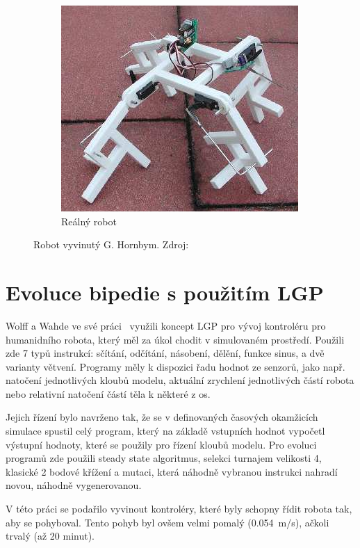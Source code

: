 \begin{figure}
\begin{subfigure}{.33\textwidth}
        \centering
        \includegraphics[width=.9\linewidth]{obrazky/hornby_model_1_real.png}
        \caption{Reálný robot}
        \label{fig:hornby_roboti_real}
    \end{subfigure}
    \caption{Robot vyvinutý G. Hornbym. Zdroj:~\cite{Hornby2003}}
    \label{fig:hornby_roboti}
\end{figure}

\section{Evoluce bipedie s použitím LGP}
\label{sec:bipedie_lgp}

Wolff a Wahde ve své práci~\cite{Wolff2007} využili koncept LGP pro vývoj kontroléru pro humanidního robota, který měl za úkol chodit v simulovaném prostředí.
Použili zde 7 typů instrukcí: sčítání, odčítání, násobení, dělění, funkce sinus, a dvě varianty větvení.
Programy měly k dispozici řadu hodnot ze senzorů, jako např. natočení jednotlivých kloubů modelu, aktuální zrychlení jednotlivých částí robota nebo relativní natočení částí těla k některé z os.

Jejich řízení bylo navrženo tak, že se v definovaných časových okamžicích simulace spustil celý program, který na základě vstupních hodnot vypočetl výstupní hodnoty, které se použily pro řízení kloubů modelu.
Pro evoluci programů zde použili steady state algoritmus, selekci turnajem velikosti 4, klasické 2 bodové křížení a mutaci, která náhodně vybranou instrukci nahradí novou, náhodně vygenerovanou.

V této práci se podařilo vyvinout kontroléry, které byly schopny řídit robota tak, aby se pohyboval.
Tento pohyb byl ovšem velmi pomalý (0.054~m/s), ačkoli trvalý (až 20 minut).


